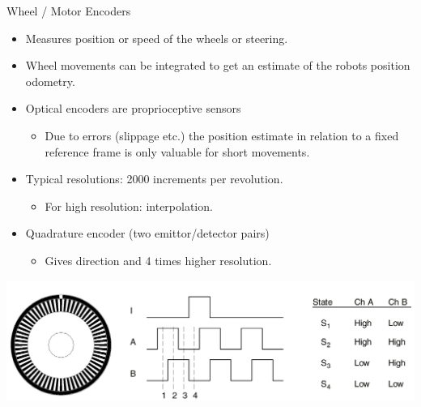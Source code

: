 \documentclass[compress]{beamer}
\begin{document}
\begin{frame}{Wheel / Motor Encoders}

\begin{itemize}
    \item Measures position or speed of the wheels or steering.

\item Wheel movements can be integrated to get an estimate of the robots
position \rightarrow odometry.

\item Optical encoders are proprioceptive sensors

\begin{itemize}

\item
  Due to errors (slippage etc.) the position estimate in relation to a
  fixed reference frame is only valuable for short movements.
\end{itemize}

\item Typical resolutions: 2000 increments per revolution.

\begin{itemize}

\item
  For high resolution: interpolation.
\end{itemize}

\item Quadrature encoder (two emittor/detector pairs)

\begin{itemize}

\item
  Gives direction and 4 times higher resolution.
\end{itemize}

\end{itemize}

    \begin{center}
        \includegraphics[width=0.9\linewidth]{encoders1}
    \end{center}

\end{frame}
\end{document}
